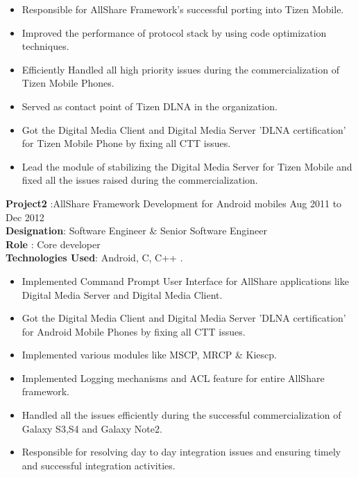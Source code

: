 \documentclass{resumeclass}
\begin{document}
\begin{resume}
 \begin{itemize} \itemsep -2pt
  \item  Responsible for AllShare Framework's successful porting into Tizen Mobile.
  \item  Improved the performance of protocol stack by using code optimization techniques.
    \item  Efficiently Handled all high priority issues during the commercialization of Tizen Mobile Phones.
    \item Served as contact point of Tizen DLNA in the organization.
  \item Got the Digital Media Client and Digital Media Server 'DLNA certification' for Tizen Mobile Phone by fixing all CTT issues.
  \item Lead the module of stabilizing the Digital Media Server for Tizen Mobile and fixed all the issues raised during the commercialization.
\end{itemize} \vspace{-6pt}

\textbf{Project2} :AllShare Framework Development for Android mobiles \hfill      Aug 2011 to Dec 2012 \\
\textbf{Designation}: Software Engineer \& Senior Software Engineer\\
\textbf{Role} : Core developer\\
\textbf{Technologies Used}: Android, C, C++ .

 \begin{itemize} \itemsep -2pt
  \item  Implemented Command Prompt User Interface for AllShare applications like Digital Media Server and Digital Media Client.
  \item  Got the Digital Media Client and Digital Media Server 'DLNA certification' for Android Mobile Phones by fixing all CTT issues.
  \item  Implemented various modules like MSCP, MRCP \& Kiescp.
  \item  Implemented Logging mechanisms and ACL feature for entire AllShare framework.
  \item  Handled all the issues efficiently during the successful commercialization of Galaxy S3,S4 and Galaxy Note2.
  \item Responsible for resolving day to day integration issues and ensuring timely and successful integration activities.
\end{itemize} \vspace{-6pt}


\end{resume}
\end{document}
